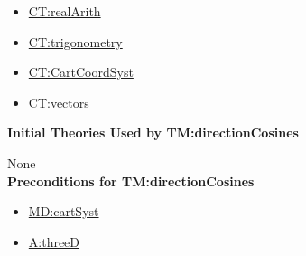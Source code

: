 \documentclass[12pt]{article}
\begin{document}
\begin{itemize}
\item \hyperref[CT:realArith]{CT:realArith}
\item \hyperref[CT:trigonometry]{CT:trigonometry}
\item \hyperref[CT:CartCoordSyst]{CT:CartCoordSyst}
\item \hyperref[CT:vectors]{CT:vectors}
\end{itemize}

\noindent \textbf{Initial Theories Used by TM:directionCosines}

None
~\\

\noindent \textbf{Preconditions for TM:directionCosines}

\begin{itemize}
\item \hyperref[MD:cartSyst]{MD:cartSyst}
\item \hyperref[threeD]{A:threeD}
\end{itemize}
\end{document}
